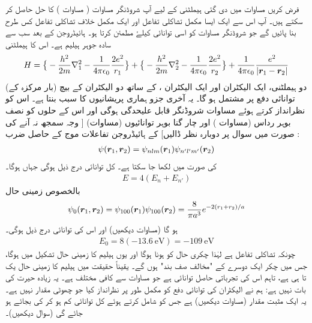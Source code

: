 فرض کریں مساوات    میں دی گئی ہیملٹنی کے لیے آپ شروڈنگر مساوات (  مساوات  )    کا 
حل  حاصل کر  سکتے ہیں۔ آپ اس سے ایک ایسا مکمل تشاکلی تفاعل اور  ایک مکمل خلاف تشاکلی تفاعل کس طرح بنا پائیں گے جو شروڈنگر مساوات کو اسی توانائی کیلۓ مطمئن کرتا ہو۔
ہائیڈروجن کے بعد سب سے  سادہ جوہر ہیلیم  ہے۔ اس کا ہیملٹنی
\begin{align}\label{مساوات_متماثل_ہیلیم_ہیملٹنی}
H= \big\{ -\frac{h^2}{2m}\nabla^2 _{1} -\frac{1}{4\pi\epsilon_{0}} \frac{2e^2}{r_{1}}\big\} +
 \big\{ -\frac{h^2}{2m} \nabla^2 _{2}-\frac{1}{4 \pi \epsilon_{0}} \frac{2e^2}{r_{2}}\big\}+ \frac{1}{4 \pi \epsilon_{0}}\frac{e^2}{|{{\boldsymbol{r}}}_{1} -{{\boldsymbol{r}}}_{2}|}
\end{align}
(بار   مرکزہ کے)  دو     ہیملٹنی، ایک  الیکٹران اور ایک  الیکٹران ،  کے ساتھ دو الیکٹران کے بیچ توانائی دفع پر مشتمل ہو گا۔ یہ آخری جزو ہماری پریشانیوں کا سبب بنتا ہے۔ اس کو نظرانداز کرتے ہوئے مساوات  شروڈنگر قابل علیحدگی ہوگی   اور اس کے حلوں کو نصف بوہر رداس (مساوات )   اور چار گنا بوہر توانائیوں (مساوات) [  وجہ   سمجھ نہ آنے    کی صورت میں سوال  پر دوبارہ نظر ڈالیں] کے  ہائیڈروجن تفاعلات موج کے حاصل ضرب :
\begin{align}
 \psi({{\boldsymbol{r}}}_{1}, {{\boldsymbol{r}}}_{2})= \psi_{nlm} ({{\boldsymbol{r}}}_{1}) \psi_{n' l' m'} ({{\boldsymbol{r}}}_{2})
\end{align}
کی صورت میں لکھا جا سکتا ہے۔ کل توانائی درج ذیل ہوگی جہاں  ہوگا۔
\begin{align}
 E= 4(E_{n} +E_{n'})
 \end{align}
بالخصوص زمینی حال 
\begin{align}\label{مساوات_متماثل_ہیلیم_زمینی_حال}
\psi_{0}({{\boldsymbol{r}}}_{1}, {{\boldsymbol{r}}}_{2})=\psi_{100}({{\boldsymbol{r}}}_{1}) \psi_{100}({{\boldsymbol{r}}}_{2})=\frac{8}{\pi a^3}e^{-2(r_{1} + r_{2})/a}
\end{align}
ہو گا (مساوات    دیکھیں) اور اس کی توانائی درج ذیل ہوگی۔
\begin{align}\label{مساوات_متماثل_ہیلیم_توانائی_الف}
 E_{0}=8(\SI{-13.6}{\electronvolt})=\SI{-109}{\electronvolt}
 \end{align}
چونکہ  تشاکلی تفاعل ہے لہٰذا چکری  حال کو  ہونا ہوگا اور یوں ہیلیم کا  زمینی حال    تشکیل میں   ہوگا،  جس میں چکر ایک دوسرے کے "مخالف صف بند" ہوں گے۔ یقیناً حقیقت میں ہیلیم کا زمینی حال   یک تا  ہی ہے،  تاہم  اس کی تجرباتی  حاصل  توانائی   ہے  جو مساوات  سے کافی مختلف ہے۔ یہ زیادہ  حیرت کی بات نہیں ہے:  ہم نے الیکٹران کی توانائی دفع کو مکمل طور پر نظرانداز کیا جو چھوٹی مقدار نہیں ہے۔ یہ ایک مثبت مقدار   (مساوات   دیکھیں) ہے  جس کو شامل کرتے ہوئے کل توانائی کم  ہو کر       کی بجائے    ہو جائے گی  (سوال   دیکھیں)۔

